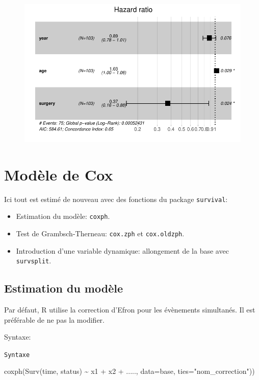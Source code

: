\documentclass[
  12pt,
  letterpaper,
  DIV=11,
  numbers=noendperiod,
  onepage,
  openany]{scrreprt}
\newenvironment{Shaded}{\begin{snugshade}}{\end{snugshade}}
\newcommand{\NormalTok}[1]{\textcolor[rgb]{0.80,0.80,0.80}{#1}}
\newcommand{\StringTok}[1]{\textcolor[rgb]{0.80,0.58,0.58}{#1}}
\providecommand{\tightlist}{%
  \setlength{\itemsep}{0pt}\setlength{\parskip}{0pt}}\usepackage{longtable,booktabs,array}
\begin{document}
\begin{figure}[H]

{\centering \includegraphics{14-R_files/figure-pdf/unnamed-chunk-13-1.pdf}

}

\end{figure}

\hypertarget{moduxe8le-de-cox-1}{%
\section{Modèle de Cox}\label{moduxe8le-de-cox-1}}

Ici tout est estimé de nouveau avec des fonctions du package
\texttt{survival}:

\begin{itemize}
\tightlist
\item
  Estimation du modèle: \texttt{coxph}.
\item
  Test de Grambsch-Therneau: \texttt{cox.zph} et \texttt{cox.oldzph}.
\item
  Introduction d'une variable dynamique: allongement de la base avec
  \texttt{survsplit}.
\end{itemize}

\hypertarget{estimation-du-moduxe8le}{%
\subsection{Estimation du modèle}\label{estimation-du-moduxe8le}}

Par défaut, R utilise la correction d'Efron pour les évènements
simultanés. Il est préférable de ne pas la modifier.

Syntaxe:

\begin{codelisting}

\caption{\texttt{Syntaxe}}

\begin{Shaded}
\begin{Highlighting}[]
\NormalTok{coxph(Surv(time, status) \textasciitilde{} x1 + x2 + ....., data=base, ties=}\StringTok{"nom\_correction"}\NormalTok{))}
\end{Highlighting}
\end{Shaded}

\end{codelisting}
\end{document}
